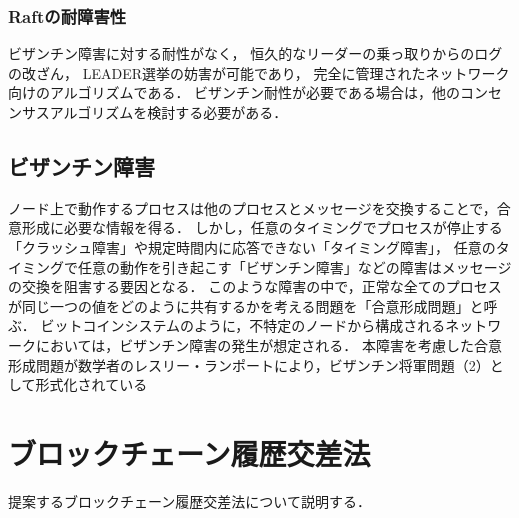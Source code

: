 \documentclass[a4paper,12pt]{jsarticle}
\begin{document}
\subsubsection{Raftの耐障害性}
ビザンチン障害に対する耐性がなく，
恒久的なリーダーの乗っ取りからのログの改ざん，
LEADER選挙の妨害が可能であり，
完全に管理されたネットワーク向けのアルゴリズムである．
ビザンチン耐性が必要である場合は，他のコンセンサスアルゴリズムを検討する必要がある．%

\subsection{ビザンチン障害}
ノード上で動作するプロセスは他のプロセスとメッセージを交換することで，合意形成に必要な情報を得る．
しかし，任意のタイミングでプロセスが停止する「クラッシュ障害」や規定時間内に応答できない「タイミング障害」，
任意のタイミングで任意の動作を引き起こす「ビザンチン障害」などの障害はメッセージの交換を阻害する要因となる．
このような障害の中で，正常な全てのプロセスが同じ一つの値をどのように共有するかを考える問題を「合意形成問題」と呼ぶ．
ビットコインシステムのように，不特定のノードから構成されるネットワークにおいては，ビザンチン障害の発生が想定される．
本障害を考慮した合意形成問題が数学者のレスリー・ランポートにより，ビザンチン将軍問題（2）として形式化されている


\newpage
\section{ブロックチェーン履歴交差法}
提案するブロックチェーン履歴交差法について説明する．
\end{document}
